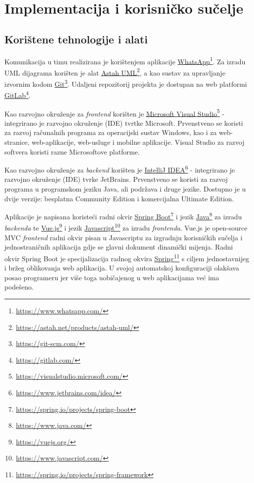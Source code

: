 \chapter{Implementacija i korisničko sučelje}
		
		
		\section{Korištene tehnologije i alati}
		
			{Komunikacija u timu realizirana je korištenjem aplikacije \underline{WhatsApp}\footnote{\url{https://www.whatsapp.com/}}. Za izradu UML dijagrama korišten je alat \underline{Astah UML}\footnote{\url{https://astah.net/products/astah-uml/}}, a kao sustav za upravljanje izvornim kodom \underline{Git}\footnote{\url{https://git-scm.com/}}. Udaljeni repozitorij projekta je dostupan na web platformi \underline{GitLab}\footnote{\url{https://gitlab.com/}}.
				
			Kao razvojno okruženje za \textit{frontend} korišten je \underline{Microsoft Visual Studio}\footnote{\url{https://visualstudio.microsoft.com/}} - integrirano je razvojno okruženje (IDE) tvrtke Microsoft. Prvenstveno se koristi za razvoj računalnih programa za operacijski sustav Windows, kao i za web-stranice, web-aplikacije, web-usluge i mobilne aplikacije. Visual Studio za razvoj softvera koristi razne Microsoftove platforme.
			
			Kao razvojno okruženje za \textit{backend} korišten je \underline{IntelliJ IDEA}\footnote{\url{https://www.jetbrains.com/idea/}} - integrirano je razvojno okruženje (IDE) tvrke JetBrains. Prvenstveno se koristi za razvoj programa u programskom jeziku Java, ali podržava i druge jezike. Dostupno je u dvije verzije: besplatna Community Edition i komercijalna Ultimate Edition.
			
			Aplikacije je napisana koristeći radni okvir \underline{Spring Boot}\footnote{\url{https://spring.io/projects/spring-boot}} i jezik \underline{Java}\footnote{\url{https://www.java.com/}} za izradu \textit{backenda} te \underline{Vue.js}\footnote{\url{https://vuejs.org/}} i jezik \underline{Javascript}\footnote{\url{https://www.javascript.com/}} za izradu \textit{frontenda}. Vue.js je open-source MVC \textit{frontend} radni okvir pisan u Javascriptu za izgradnju korisničkih sučelja i jednostraničnih aplikacija gdje se glavni dokument dinamički
			mijenja. Radni okvir Spring Boot je specijalizacija radnog okvira \underline{Spring}\footnote{\url{https://spring.io/projects/spring-framework}} s ciljem jednostavnijeg i bržeg oblikovanja web aplikacija. U svojoj automatskoj konfiguraciji olakšava posao programeru jer više toga uobičajenog u web aplikacijama već ima podešeno.
			
}

